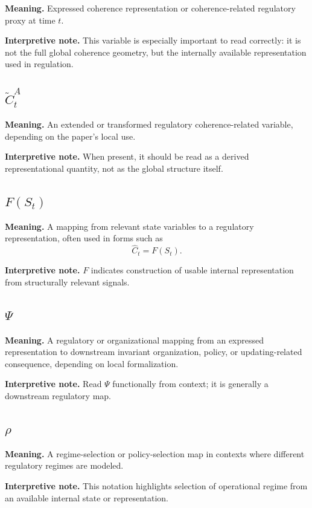 \documentclass[11pt,a4paper]{article}
\begin{document}
	\textbf{Meaning.} Expressed coherence representation or coherence-related regulatory proxy at time $t$.
	
	\textbf{Interpretive note.} This variable is especially important to read correctly: it is not the full global coherence geometry, but the internally available representation used in regulation.
	
	\subsection{$\widetilde{C}_t^A$}
	
	\textbf{Meaning.} An extended or transformed regulatory coherence-related variable, depending on the paper's local use.
	
	\textbf{Interpretive note.} When present, it should be read as a derived representational quantity, not as the global structure itself.
	
	\subsection{$F(S_t)$}
	
	\textbf{Meaning.} A mapping from relevant state variables to a regulatory representation, often used in forms such as
	\[
	\widehat{C}_t = F(S_t).
	\]
	
	\textbf{Interpretive note.} $F$ indicates construction of usable internal representation from structurally relevant signals.
	
	\subsection{$\Psi$}
	
	\textbf{Meaning.} A regulatory or organizational mapping from an expressed representation to downstream invariant organization, policy, or updating-related consequence, depending on local formalization.
	
	\textbf{Interpretive note.} Read $\Psi$ functionally from context; it is generally a downstream regulatory map.
	
	\subsection{$\rho$}
	
	\textbf{Meaning.} A regime-selection or policy-selection map in contexts where different regulatory regimes are modeled.
	
	\textbf{Interpretive note.} This notation highlights selection of operational regime from an available internal state or representation.
	
\end{document}
